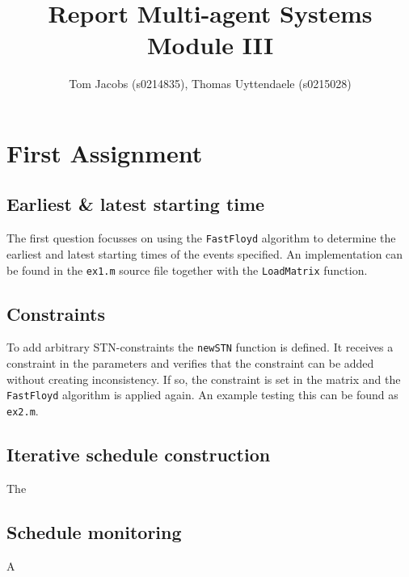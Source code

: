 \documentclass[10pt,a4paper]{article}
\title{Report Multi-agent Systems Module III}
\author{Tom Jacobs (s0214835), Thomas Uyttendaele (s0215028)}
\begin{document}
\maketitle
\tableofcontents

\section{First Assignment}
\subsection{Earliest \& latest starting time}
The first question focusses on using the \texttt{FastFloyd} algorithm to determine the earliest and latest starting times of the events specified. An implementation can be found in the \texttt{ex1.m} source file together with the \texttt{LoadMatrix} function.

\subsection{Constraints}
To add arbitrary STN-constraints the \texttt{newSTN} function is defined. It receives a constraint in the parameters and verifies that the constraint can be added without creating inconsistency. If so, the constraint is set in the matrix and the \texttt{FastFloyd} algorithm is applied again. An example testing this can be found as \texttt{ex2.m}.

\subsection{Iterative schedule construction}
\label{sec:iterative}
The

\subsection{Schedule monitoring}
A
\end{document}
